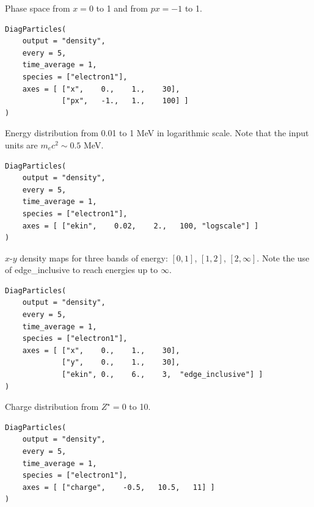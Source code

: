 \documentclass[11pt]{article}
\newcommand{\code}[1]{\colorbox{yellow!15}{\ttfamily #1}}
\begin{document}
Phase space from $x=0$ to 1 and from $px=-1$ to 1.
\begin{lstlisting}
DiagParticles(
	output = "density",
	every = 5,
	time_average = 1,
	species = ["electron1"],
	axes = [ ["x",    0.,    1.,    30],
	         ["px",   -1.,   1.,    100] ]
)
\end{lstlisting}

Energy distribution from 0.01 to 1 MeV in logarithmic scale.
Note that the input units are $m_ec^2 \sim 0.5$ MeV.
\begin{lstlisting}
DiagParticles(
	output = "density",
	every = 5,
	time_average = 1,
	species = ["electron1"],
	axes = [ ["ekin",    0.02,    2.,   100, "logscale"] ]
)
\end{lstlisting}

$x$-$y$ density maps for three bands of energy: $[0,1]$, $[1,2]$, $[2,\infty]$.
Note the use of \code{edge\_inclusive} to reach energies up to $\infty$.
\begin{lstlisting}
DiagParticles(
	output = "density",
	every = 5,
	time_average = 1,
	species = ["electron1"],
	axes = [ ["x",    0.,    1.,    30],
	         ["y",    0.,    1.,    30],
	         ["ekin", 0.,    6.,    3,  "edge_inclusive"] ]
)
\end{lstlisting}

Charge distribution from $Z^\star =0$ to 10.
\begin{lstlisting}
DiagParticles(
	output = "density",
	every = 5,
	time_average = 1,
	species = ["electron1"],
	axes = [ ["charge",    -0.5,   10.5,   11] ]
)
\end{lstlisting}
\end{document}
